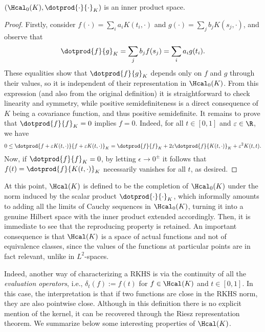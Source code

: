 \begin{proposition} \((\Hcal_0(K), \dotprod{\cdot}{\cdot}_K)\) is an inner product space.
\end{proposition}
  \begin{proof}
    Firstly, consider \(f(\cdot)=\sum_i a_i K(t_i, \cdot) \) and \(g(\cdot)=\sum_j b_j K(s_j, \cdot)\), and observe that
    \[
      \dotprod{f}{g}_K = \sum_j b_j f(s_j) = \sum_i a_i g(t_i).
    \]
    These equalities show that \(\dotprod{f}{g}_K\) depends only on \(f\) and \(g\) through their values, so it is independent of their representation in \(\Hcal_0(K)\). From this expression (and also from the original definition) it is straightforward to check linearity and symmetry, while positive semidefiniteness is a direct consequence of \(K\) being a covariance function, and thus positive semidefinite. It remains to prove that \(\dotprod{f}{f}_K=0\) implies \(f=0\). Indeed, for all \(t\in[0,1]\) and \(\epsilon \in \R\), we have
    \[
    0 \leq \dotprod{f + \epsilon K(t, \cdot)}{f + \epsilon K(t, \cdot)}_K = \dotprod{f}{f}_K + 2\epsilon\dotprod{f}{K(t, \cdot)}_K + \epsilon^2 K(t, t).
    \]
    Now, if \(\dotprod{f}{f}_K=0\), by letting \(\epsilon\to 0^{\pm}\) it follows that \(f(t)=\dotprod{f}{K(t, \cdot)}_K\) necessarily vanishes for all \(t\), as desired.
  \end{proof}

At this point, \(\Hcal(K)\) is defined to be the completion of \(\Hcal_0(K)\) under the norm induced by the scalar product \(\dotprod{\cdot}{\cdot}_K\), which informally amounts to adding all the limits of Cauchy sequences in \(\Hcal_0(K)\), turning it into a genuine Hilbert space with the inner product extended accordingly. Then, it is immediate to see that the reproducing property is retained. An important consequence is that \(\Hcal(K)\) is a space of actual functions and not of equivalence classes, since the values of the functions at particular points are in fact relevant, unlike in \(L^2\)-spaces.

Indeed, another way of characterizing a RKHS is via the continuity of all the \textit{evaluation operators}, i.e., \(\delta_t(f) := f(t)\) for \(f\in\Hcal(K)\) and \(t\in[0,1]\). In this case, the interpretation is that if two functions are close in the RKHS norm, they are also pointwise close. Although in this definition there is no explicit mention of the kernel, it can be recovered through the Riesz representation theorem. We summarize below some interesting properties of \(\Hcal(K)\).

